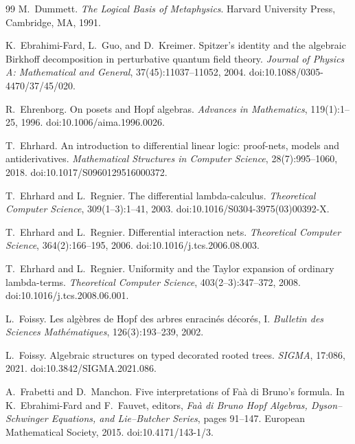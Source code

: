 \documentclass[10pt,a4paper]{article}
\theoremstyle{plain}
\theoremstyle{definition}
\theoremstyle{remark}
\begin{document}
\begin{thebibliography}{99}
M.~Dummett.
\newblock \emph{The Logical Basis of Metaphysics}.
\newblock Harvard University Press, Cambridge, MA, 1991.

K.~Ebrahimi-Fard, L.~Guo, and D.~Kreimer.
\newblock Spitzer's identity and the algebraic Birkhoff decomposition in
perturbative quantum field theory.
\newblock \emph{Journal of Physics A: Mathematical and General},
37(45):11037--11052, 2004.
\newblock doi:10.1088/0305-4470/37/45/020.

R.~Ehrenborg.
\newblock On posets and Hopf algebras.
\newblock \emph{Advances in Mathematics}, 119(1):1--25, 1996.
\newblock doi:10.1006/aima.1996.0026.

T.~Ehrhard.
\newblock An introduction to differential linear logic: proof-nets, models
and antiderivatives.
\newblock \emph{Mathematical Structures in Computer Science},
28(7):995--1060, 2018.
\newblock doi:10.1017/S0960129516000372.

T.~Ehrhard and L.~Regnier.
\newblock The differential lambda-calculus.
\newblock \emph{Theoretical Computer Science}, 309(1--3):1--41, 2003.
\newblock doi:10.1016/S0304-3975(03)00392-X.

T.~Ehrhard and L.~Regnier.
\newblock Differential interaction nets.
\newblock \emph{Theoretical Computer Science}, 364(2):166--195, 2006.
\newblock doi:10.1016/j.tcs.2006.08.003.

T.~Ehrhard and L.~Regnier.
\newblock Uniformity and the Taylor expansion of ordinary lambda-terms.
\newblock \emph{Theoretical Computer Science}, 403(2--3):347--372, 2008.
\newblock doi:10.1016/j.tcs.2008.06.001.

L.~Foissy.
\newblock Les alg\`ebres de Hopf des arbres enracin\'es d\'ecor\'es, I.
\newblock \emph{Bulletin des Sciences Math\'ematiques}, 126(3):193--239,
2002.

L.~Foissy.
\newblock Algebraic structures on typed decorated rooted trees.
\newblock \emph{SIGMA}, 17:086, 2021.
\newblock doi:10.3842/SIGMA.2021.086.

A.~Frabetti and D.~Manchon.
\newblock Five interpretations of Fa\`a di Bruno's formula.
\newblock In K.~Ebrahimi-Fard and F.~Fauvet, editors,
\emph{Fa\`a di Bruno Hopf Algebras, Dyson--Schwinger Equations, and
Lie--Butcher Series}, pages 91--147. European Mathematical Society, 2015.
\newblock doi:10.4171/143-1/3.


\end{thebibliography}
\end{document}
